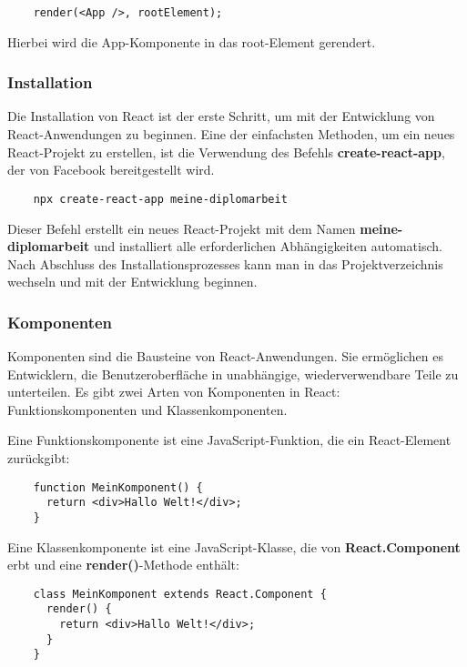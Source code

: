 \begin{lstlisting}
    render(<App />, rootElement);
\end{lstlisting}

Hierbei wird die App-Komponente in das root-Element gerendert.

\subsubsection{Installation}
Die Installation von React ist der erste Schritt, um mit der Entwicklung von React-Anwendungen zu beginnen. Eine der einfachsten Methoden, um ein neues React-Projekt zu erstellen, ist die Verwendung des Befehls \textbf{create-react-app}, der von Facebook bereitgestellt wird.

\begin{lstlisting}
    npx create-react-app meine-diplomarbeit
\end{lstlisting}

Dieser Befehl erstellt ein neues React-Projekt mit dem Namen \textbf{meine-diplomarbeit} und installiert alle erforderlichen Abhängigkeiten automatisch. Nach Abschluss des Installationsprozesses kann man in das Projektverzeichnis wechseln und mit der Entwicklung beginnen.

\cite{frontend_web_react_installation}

\subsubsection{Komponenten}
Komponenten sind die Bausteine von React-Anwendungen. Sie ermöglichen es Entwicklern, die Benutzeroberfläche in unabhängige, wiederverwendbare Teile zu unterteilen. Es gibt zwei Arten von Komponenten in React: Funktionskomponenten und Klassenkomponenten.

Eine Funktionskomponente ist eine JavaScript-Funktion, die ein React-Element zurückgibt:

\begin{lstlisting}
    function MeinKomponent() {
      return <div>Hallo Welt!</div>;
    }
\end{lstlisting}
\newpage
Eine Klassenkomponente ist eine JavaScript-Klasse, die von \textbf{React.Component} erbt und eine \textbf{render()}-Methode enthält:

\begin{lstlisting}
    class MeinKomponent extends React.Component {
      render() {
        return <div>Hallo Welt!</div>;
      }
    }
\end{lstlisting}

